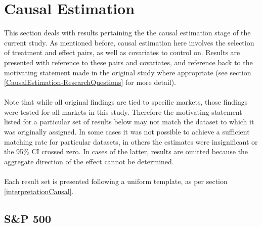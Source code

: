 \section{Causal Estimation}\label{S.causal4}
{This section deals with results pertaining the the causal estimation stage of the current study. As mentioned before, causal estimation here involves the selection of treatment and effect pairs, as well as covariates to control on. Results are presented with reference to these pairs and covariates, and reference back to the motivating statement made in the original study where appropriate (see section \ref{CausalEstimation-ResearchQuestions} for more detail). \\\\
Note that while all original findings are tied to specific markets, those findings were tested for all markets in this study. Therefore the motivating statement listed for a particular set of results below may not match the dataset to which it was originally assigned. In some cases it was not possible to achieve a sufficient matching rate for particular datasets, in others the estimates were insignificant or the 95\% CI crossed zero. In cases of the latter, results are omitted because the aggregate direction of the effect cannot be determined.\\\\
Each result set is presented following a uniform template, as per section \ref{interpretationCausal}. 
\clearpage
\subsection{S\&P 500}
}

